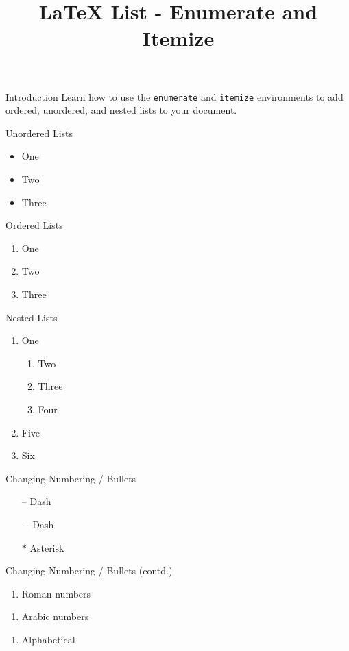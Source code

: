 \documentclass{beamer}
\title{\LaTeX{} List - Enumerate and Itemize}
\begin{document}
\begin{frame}
  \titlepage
\end{frame}

\begin{frame}{Introduction}
  Learn how to use the \texttt{enumerate} and \texttt{itemize} environments to add ordered, unordered, and nested lists to your document.
\end{frame}

\begin{frame}{Unordered Lists}
  \begin{itemize}
    \item One
    \item Two
    \item Three
  \end{itemize}
\end{frame}

\begin{frame}{Ordered Lists}
  \begin{enumerate}
    \item One
    \item Two
    \item Three
  \end{enumerate}
\end{frame}

\begin{frame}{Nested Lists}
  \begin{enumerate}
    \item One
    \begin{enumerate}
      \item Two
      \item Three
      \item Four
    \end{enumerate}
    \item Five
    \item Six
  \end{enumerate}
\end{frame}

\begin{frame}{Changing Numbering / Bullets}
  \begin{itemize}
    \item[--] Dash
    \item[$-$] Dash
    \item[$\ast$] Asterisk
  \end{itemize}
\end{frame}

\begin{frame}{Changing Numbering / Bullets (contd.)}
  \begin{enumerate}[i]
    \item Roman numbers
  \end{enumerate}
  
  \begin{enumerate}[1]
    \item Arabic numbers
  \end{enumerate}
  
  \begin{enumerate}[A]
    \item Alphabetical
  \end{enumerate}
\end{frame}
\end{document}
